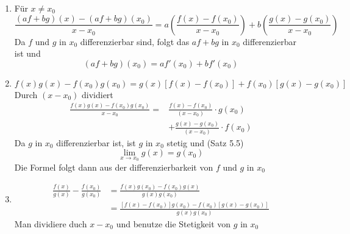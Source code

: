 \begin{beweis}{}
\begin{enumerate}
\item Für $x\not=x_0$ 
\[\frac{{\left( {af + bg} \right)\left( x \right) - \left( {af + bg} \right)\left( {{x_0}} \right)}}{{x - {x_0}}} = a\left( {\frac{{f\left( x \right) - f\left( {{x_0}} \right)}}{{x - {x_0}}}} \right) + b\left( {\frac{{g\left( x \right) - g\left( {{x_0}} \right)}}{{x - {x_0}}}} \right)\]
Da $f$ und $g$ in $x_0$ differenzierbar sind, folgt das $af+bg$ in $x_0$ differenzierbar ist und 
\[\left( {af + bg} \right)\left( {{x_0}} \right) = af'\left( {{x_0}} \right) + bf'\left( {{x_0}} \right)\]
\item \[f\left( x \right)g\left( x \right) - f\left( {{x_0}} \right)g\left( {{x_0}} \right) = g\left( x \right)\left[ {f\left( x \right) - f\left( {{x_0}} \right)} \right] + f\left( {{x_0}} \right)\left[ {g\left( x \right) - g\left( {{x_0}} \right)} \right]\]
Durch $\left( x-x_0\right)$ dividiert
\begin{align*}
\frac{{f\left( x \right)g\left( x \right) - f\left( {{x_0}} \right)g\left( {{x_0}} \right)}}{{x - {x_0}}} =& \frac{{f\left( x \right) - f\left( {{x_0}} \right)}}{{\left( {x - {x_0}} \right)}} \cdot g\left( {{x_0}} \right)\\
 &+ \frac{{g\left( x \right) - g\left( {{x_0}} \right)}}{{\left( {x - {x_0}} \right)}} \cdot f\left( {{x_0}} \right)
\end{align*}
Da $g$ in $x_0$ differenzierbar ist, ist $g$ in $x_0$ stetig und (Satz 5.5)
\[\mathop {\lim }\limits_{x \to {x_0}} g\left( x \right) = g\left( {{x_0}} \right)\]
Die Formel folgt dann aus der differenzierbarkeit von $f$ und $g$ in $x_0$ 
\item \begin{align*}
\frac{{f\left( x \right)}}{{g\left( x \right)}} - \frac{{f\left( {{x_0}} \right)}}{{g\left( {{x_0}} \right)}} &= \frac{{f\left( x \right)g\left( {{x_0}} \right) - f\left( {{x_0}} \right)g\left( x \right)}}{{g\left( x \right)g\left( {{x_0}} \right)}}\\
 &= \frac{{\left[ {f\left( x \right) - f\left( {{x_0}} \right)} \right]g\left( {{x_0}} \right) - f\left( {{x_0}} \right)\left[ {g\left( x \right) - g\left( {{x_0}} \right)} \right]}}{{g\left( x \right)g\left( {{x_0}} \right)}}
\end{align*}
Man dividiere duch $x-x_0$ und benutze die Stetigkeit von $g$ in $x_0$ 
\end{enumerate}
\end{beweis}
